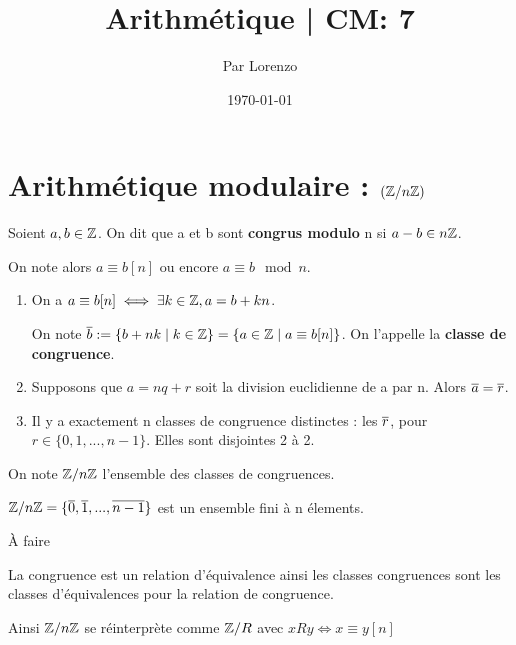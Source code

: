 \documentclass[a4paper, 12pt]{article}
\title{Arithmétique | CM: 7}
\author{Par Lorenzo}
\date{\today}
\begin{document}
\maketitle

\section{Arithmétique modulaire : $(\mathbb{Z}/n\mathbb{Z})$}

\begin{definition}
    Soient $a, b \in \mathbb{Z}$. On dit que a et b sont \textbf{congrus modulo} n si $a - b \in n\mathbb{Z}$.
    
    On note alors $a \equiv b [n]$ ou encore $a \equiv b \mod n$.
\end{definition}

\begin{proposition}
    \begin{enumerate}
        \item On a $a \equiv b [n] \iff \exists k \in \mathbb{Z}, a = b + kn$.
        
        On note $\overline{b} := \{b + nk \mid k \in \mathbb{Z}\} = \{a \in \mathbb{Z} \mid a \equiv b [n]\}$. On l'appelle la \textbf{classe de congruence}.
    
        \item Supposons que $a = nq + r$ soit la division euclidienne de a par n. Alors $\overline{a} = \overline{r}$.
        \item Il y a exactement n classes de congruence distinctes : les $\overline{r}$, pour $r \in \{0, 1, ..., n-1\}$. Elles sont disjointes 2 à 2.
    \end{enumerate}
\end{proposition}

\begin{definition}
    On note $\mathbb{Z}/n\mathbb{Z}$ l'ensemble des classes de congruences.

    $\mathbb{Z}/n\mathbb{Z} = \{\overline{0}, \overline{1}, ..., \overline{n-1}\}$ est un ensemble fini à n élements.
\end{definition}

\begin{demonstration}
    À faire
\end{demonstration}

\begin{remark}
    La congruence est un relation d'équivalence ainsi les classes congruences sont les classes d'équivalences pour la relation de congruence.

    Ainsi $\mathbb{Z}/n\mathbb{Z}$ se réinterprète comme $\mathbb{Z}/R$ avec $xRy \iff x \equiv y [n]$
\end{remark}
\end{document}
